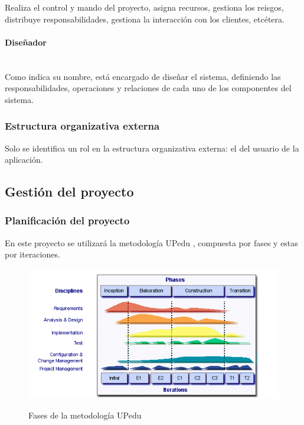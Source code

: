 \documentclass[twoside]{report}
\begin{document}
Realiza el control y mando del proyecto, asigna recursos, gestiona los reisgos, distribuye responsabilidades, gestiona la interacción con los clientes, etcétera.

\paragraph{Diseñador}\mbox{}\\

Como indica su nombre, está encargado de diseñar el sistema, definiendo las responsabilidades, operaciones y relaciones de cada uno de los componentes del sistema.

\subsubsection{Estructura organizativa externa}
Solo se identifica un rol en la estructura organizativa externa: el del usuario de la aplicación. 

\subsection{Gestión del proyecto}
\subsubsection{Planificación del proyecto}
En este proyecto se utilizará la metodología UPedu \cite{upedu}, compuesta por fases y estas por iteraciones.

\begin{figure}[h]
\begin{center}
\includegraphics[scale=0.75]{images/upeduFases}
\caption{Fases de la metodología UPedu} \cite{upedu}
\end{center}
\end{figure}
\end{document}
